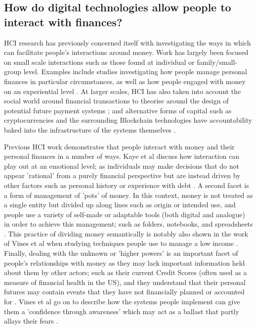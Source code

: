 \subsection{How do digital technologies allow people to interact with finances?}%
HCI research has previously concerned itself with investigating the ways in which can facilitate people's interactions around money. Work has largely been focused on small scale interactions such as those found at individual or family/small-group level. Examples include studies investigating how people manage personal finances in particular circumstances, as well as how people engaged with money on an experiential level \cite{vines_pay_2014, vines_eighty_2011}. At larger scales, HCI has also taken into account the social world around financial transactions to theorise around the design of potential future payment systems \cite{ferreira_spending_2015}; and alternative forms of capital such as cryptocurrencies and the surrounding Blockchain technologies have accountability baked into the infrastructure of the systems themselves .
%

Previous HCI work demonstrates that people interact with money and their personal finances in a number of ways. Kaye et al discuss how interaction can play out at an emotional level; as individuals may make decisions that do not appear 'rational' from a purely financial perspective but are instead driven by other factors such as personal history or experience with debt \cite{kaye_money_2014}. A second facet is a form of management of 'pots' of money. In this context, money is not treated as a single entity but divided up along lines such as origin or intended use, and people use a variety of self-made or adaptable tools (both digital and analogue) in order to achieve this management; such as folders, notebooks, and spreadsheets \cite{kaye_money_2014}. This practice of dividing money semantically is notably also shown in the work of Vines et al when studying techniques people use to manage a low income \cite{vines_pay_2014}. Finally, dealing with the unknown or 'higher powers' is an important facet of people's relationships with money as they may lack important information held about them by other actors; such as their current Credit Scores (often used as a measure of financial health in the US), and they understand that their personal futures may contain events that they have not financially planned or accounted for \cite{kaye_money_2014}. Vines et al go on to describe how the systems people implement can give them a 'confidence through awareness' which may act as a ballast that partly allays their fears \cite{vines_pay_2014}.


